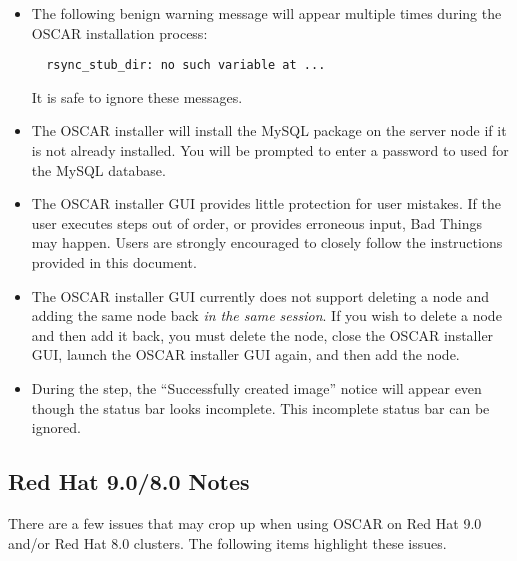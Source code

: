 \begin{itemize}
\item The following benign warning message will appear multiple times
  during the OSCAR installation process:

\begin{verbatim}
  rsync_stub_dir: no such variable at ...
\end{verbatim}

  It is safe to ignore these messages.
  
\item The OSCAR installer will install the MySQL package on the server
  node if it is not already installed.  You will be prompted to enter a
  password to used for the MySQL database.
  
\item The OSCAR installer GUI provides little protection for user
  mistakes.  If the user executes steps out of order, or provides
  erroneous input, Bad Things may happen.  Users are strongly
  encouraged to closely follow the instructions provided in this
  document.

\item The OSCAR installer GUI currently does not support deleting a
  node and adding the same node back {\em in the same session}.  If
  you wish to delete a node and then add it back, you must delete the
  node, close the OSCAR installer GUI, launch the OSCAR installer GUI
  again, and then add the node.

\item During the  step, the ``Successfully
  created image'' notice will appear even though the status bar looks
  incomplete.  This incomplete status bar can be ignored.

\end{itemize}


\subsection{Red Hat 9.0/8.0 Notes}
\label{subsec:rh90notes}

There are a few issues that may crop up when using OSCAR on Red Hat 9.0
and/or Red Hat 8.0 clusters.  The following items highlight these
issues.  


